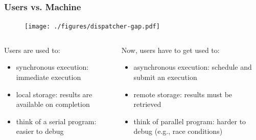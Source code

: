 \documentclass[]{rsuqbeamernew}
\begin{document}
\begin{frame}
\frametitle{Users vs. Machine}
\begin{figure}[htbp]
  \texttt{[image: ./figures/dispatcher-gap.pdf]}
\end{figure}

\begin{columns}
  \begin{column}{0.5\linewidth}
    \begin{block}{Users are used to:}
      \begin{itemize}
        \item {\altx synchronous execution}: immediate execution
        \item {\altx local storage}: results are available on completion
        \item {\altx think of a serial program}: easier to debug
      \end{itemize}
    \end{block}
  \end{column}
  \begin{column}{0.5\linewidth}
    \begin{block}{Now, users have to get used to:}
      \begin{itemize}
        \item {\altx asynchronous execution}: schedule and submit an execution
        \item {\altx remote storage}: results must be retrieved
        \item {\altx think of parallel program}: harder to debug (e.g., race conditions)
      \end{itemize}
    \end{block}
  \end{column}
\end{columns}

\end{frame}
  
\end{document}
